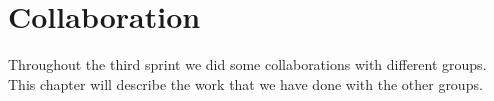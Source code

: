 
\chapter{Collaboration}
Throughout the third sprint we did some collaborations with different groups. This chapter will describe the work that we have done with the other groups.



